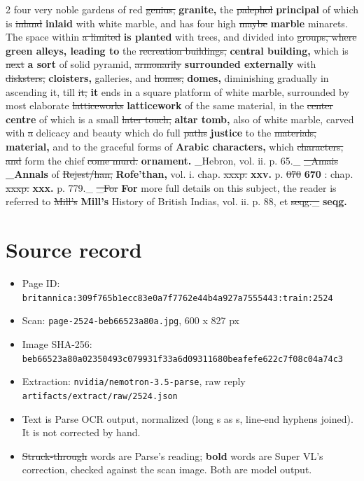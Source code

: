 \documentclass[10pt]{article}
\begin{document}
\begin{multicols}{2}
four very noble gardens of red \sout{genius,} \textbf{granite,} the \sout{palephol} \textbf{principal} of which is \sout{inland} \textbf{inlaid} with white marble, and has four high \sout{maybe} \textbf{marble} minarets. The space within \sout{a limited} \textbf{is planted} with trees, and divided into \sout{groups, where} \textbf{green alleys, leading to} the \sout{recreation buildings,} \textbf{central building,} which is \sout{next} \textbf{a sort} of solid pyramid, \sout{armonarily} \textbf{surrounded externally} with \sout{disksters,} \textbf{cloisters,} galleries, and \sout{homes,} \textbf{domes,} diminishing gradually in ascending it, till \sout{it,} \textbf{it} ends in a square platform of white marble, surrounded by most elaborate \sout{latticeworks} \textbf{latticework} of the same material, in the \sout{center} \textbf{centre} of which is a small \sout{later touch,} \textbf{altar tomb,} also of white marble, carved with \sout{a} delicacy and beauty which do full \sout{paths} \textbf{justice} to the \sout{materials,} \textbf{material,} and to the graceful forms of \textbf{Arabic characters,} which \sout{characters, and} form the chief \sout{come murd.} \textbf{ornament.} \_Hebron, vol. ii. p. 65.\_ \sout{\_Amais} \textbf{\_Annals} of \sout{Rejest/han,} \textbf{Rofe'than,} vol. i. chap. \sout{xxxp.} \textbf{xxv.} p. \sout{070} \textbf{670} : chap. \sout{xxxp.} \textbf{xxx.} p. 779.\_ \sout{\_For} \textbf{For} more full details on this subject, the reader is referred to \sout{Mill’s} \textbf{Mill's} History of British Indias, vol. ii. p. 88, et \sout{seqg.\_} \textbf{seqg.}
\end{multicols}
\section*{Source record}
\begin{itemize}
\item Page ID: \texttt{britannica:309f765b1ecc83e0a7f7762e44b4a927a7555443:train:2524}
\item Scan: \texttt{page-2524-beb66523a80a.jpg}, 600 x 827 px
\item Image SHA-256: \texttt{\small beb66523a80a02350493c079931f33a6d09311680beafefe622c7f08c04a74c3}
\item Extraction: \texttt{nvidia/nemotron-3.5-parse}, raw reply \texttt{artifacts/extract/raw/2524.json}
\item Text is Parse OCR output, normalized (long s as s, line-end hyphens joined). It is not corrected by hand.
\item \sout{Struck-through} words are Parse's reading; \textbf{bold} words are Super VL's correction, checked against the scan image. Both are model output.
\end{itemize}
\end{document}
